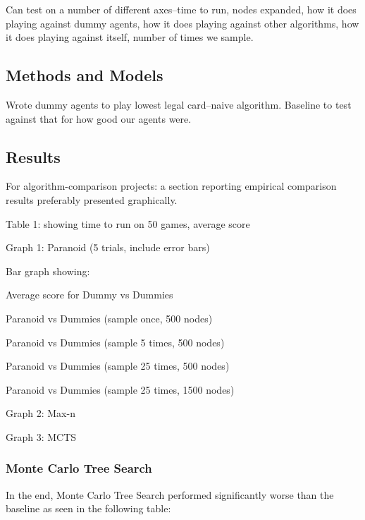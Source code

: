 \documentclass[11pt]{article}
\begin{document}
Can test on a number of different axes--time to run, nodes expanded, how it does playing against dummy agents, how it does playing against other algorithms, how it does playing against itself, number of times we sample.


\subsection{Methods and Models}

Wrote dummy agents to play lowest legal card--naive algorithm. Baseline to test against that for how good our agents were.

\subsection{Results}

 For algorithm-comparison projects: a section reporting empirical comparison results preferably presented graphically.

Table 1: showing time to run on 50 games, average score

Graph 1: Paranoid (5 trials, include error bars)

Bar graph showing: 

Average score for Dummy vs Dummies

Paranoid vs Dummies (sample once, 500 nodes)

Paranoid vs Dummies (sample 5 times, 500 nodes)

Paranoid vs Dummies (sample 25 times, 500 nodes)

Paranoid vs Dummies (sample 25 times, 1500 nodes)

Graph 2: Max-n

Graph 3: MCTS

\subsubsection{Monte Carlo Tree Search}

In the end, Monte Carlo Tree Search performed significantly worse than the baseline as seen in the following table:
\end{document}
